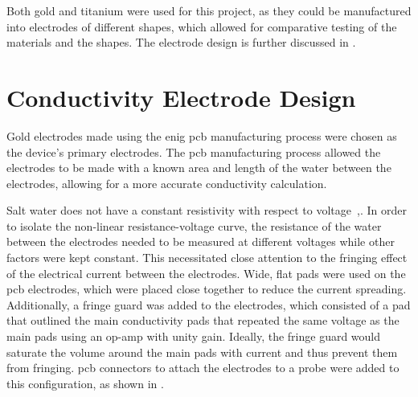 Both gold and titanium were used for this project, as they could be manufactured into electrodes of different shapes, which allowed for comparative testing of the materials and the shapes.
The electrode design is further discussed in .

\section{Conductivity Electrode Design}\label{sec:conductivity-electrode-design}

Gold electrodes made using the \gls{enig} \gls{pcb} manufacturing process were chosen as the device's primary electrodes.
The \gls{pcb} manufacturing process allowed the electrodes to be made with a known area and length of the water between the electrodes, allowing for a more accurate conductivity calculation.

Salt water does not have a constant resistivity with respect to voltage~\cite{benjankar_ec_based_salt_measurement_2021},\cite{mccomas_inquiry_into_physics_2005}.
In order to isolate the non-linear resistance-voltage curve, the resistance of the water between the electrodes needed to be measured at different voltages while other factors were kept constant.
This necessitated close attention to the fringing effect of the electrical current between the electrodes.
Wide, flat pads were used on the \gls{pcb} electrodes, which were placed close together to reduce the current spreading.
Additionally, a fringe guard was added to the electrodes, which consisted of a pad that outlined the main conductivity pads that repeated the same voltage as the main pads using an op-amp with unity gain.
Ideally, the fringe guard would saturate the volume around the main pads with current and thus prevent them from fringing.
\gls{pcb} connectors to attach the electrodes to a probe were added to this configuration, as shown in .

